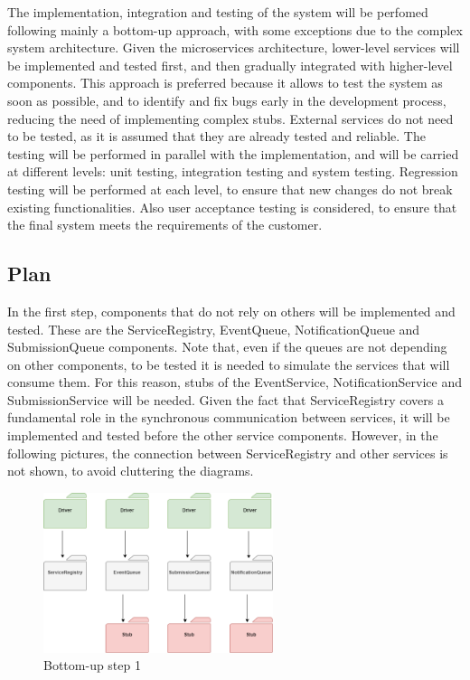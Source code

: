The implementation, integration and testing of the system will be perfomed following mainly a bottom-up approach, with some exceptions due to the complex system architecture.
Given the microservices architecture, lower-level services will be implemented and tested first, and then gradually integrated with higher-level components.
This approach is preferred because it allows to test the system as soon as possible, and to identify and fix bugs early in the development process, reducing the need of implementing complex stubs.
External services do not need to be tested, as it is assumed that they are already tested and reliable.
The testing will be performed in parallel with the implementation, and will be carried at different levels: unit testing, integration testing and system testing.
Regression testing will be performed at each level, to ensure that new changes do not break existing functionalities.
Also user acceptance testing is considered, to ensure that the final system meets the requirements of the customer. \\

\subsection{Plan}
In the first step, components that do not rely on others will be implemented and tested. These are the ServiceRegistry, EventQueue, NotificationQueue and SubmissionQueue components.
Note that, even if the queues are not depending on other components, to be tested it is needed to simulate the services that will consume them. For this reason, stubs of the EventService, NotificationService and SubmissionService will be needed.
Given the fact that ServiceRegistry covers a fundamental role in the synchronous communication between services, it will be implemented and tested before the other service components. 
However, in the following pictures, the connection between ServiceRegistry and other services is not shown, to avoid cluttering the diagrams.
\begin{figure}[H]
    \centering
    \includegraphics[width=0.6\textwidth]{Diagrams/integration_1.png}
    \caption{Bottom-up step 1}
\end{figure}

